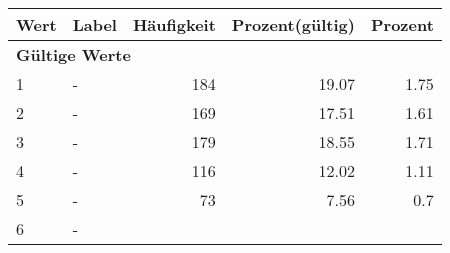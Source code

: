      \begin{longtable}{lXrrr}
     \toprule
     \textbf{Wert} & \textbf{Label} & \textbf{Häufigkeit} & \textbf{Prozent(gültig)} & \textbf{Prozent} \\
     \endhead
     \midrule
     \multicolumn{5}{l}{\textbf{Gültige Werte}}\\

     1 &
     \multicolumn{1}{X}{ -  } &


       \num{184} &
       \num[round-mode=places,round-precision=2]{19.07} &
         \num[round-mode=places,round-precision=2]{1.75} \\

     2 &
     \multicolumn{1}{X}{ -  } &


       \num{169} &
       \num[round-mode=places,round-precision=2]{17.51} &
         \num[round-mode=places,round-precision=2]{1.61} \\

     3 &
     \multicolumn{1}{X}{ -  } &


       \num{179} &
       \num[round-mode=places,round-precision=2]{18.55} &
         \num[round-mode=places,round-precision=2]{1.71} \\

     4 &
     \multicolumn{1}{X}{ -  } &


       \num{116} &
       \num[round-mode=places,round-precision=2]{12.02} &
         \num[round-mode=places,round-precision=2]{1.11} \\

     5 &
     \multicolumn{1}{X}{ -  } &


       \num{73} &
       \num[round-mode=places,round-precision=2]{7.56} &
         \num[round-mode=places,round-precision=2]{0.7} \\

     6 &
     \multicolumn{1}{X}{ -  } &



\end{longtable}
